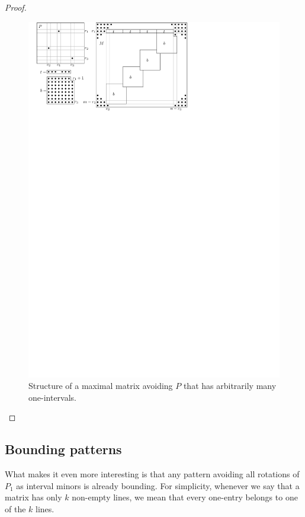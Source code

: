 \begin{proof}
\begin{figure}[!ht]
\centering
\includegraphics[width=120mm]{img/manyints.pdf}
\caption{Structure of a maximal matrix avoiding $P$ that has arbitrarily many one-intervals.}
\label{fig:manyints}
\end{figure}
\end{proof}

\subsection{Bounding patterns}
\label{subsec:bound}
What makes it even more interesting is that any pattern avoiding all rotations of $P_1$ as interval minors is already bounding. For simplicity, whenever we say that a matrix has only $k$ non-empty lines, we mean that every one-entry belongs to one of the $k$ lines.

